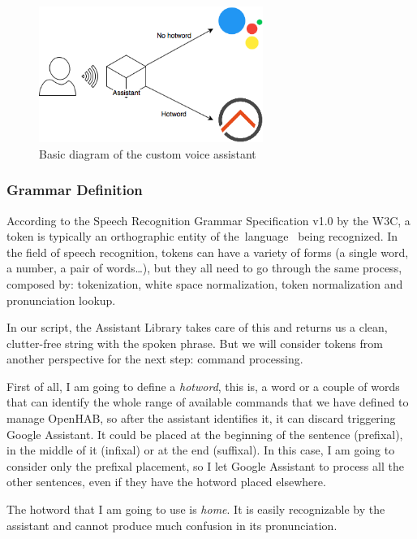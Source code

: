 \begin{figure}
	\centering
	\includegraphics[width=0.65\textwidth]{images/Chapter_06/custom-assistant-simple.png}
	\caption{Basic diagram of the custom voice assistant}
	\label{fig:custom-assistant-simple}
\end{figure}

\subsubsection{Grammar Definition}
According to the Speech Recognition Grammar Specification v1.0 by the W3C, a token is typically an orthographic entity of the language 
being recognized. In the field of speech recognition, tokens can have a variety of forms (a single word, a number, a pair of words…),
but they all need to go through the same process, composed by: tokenization, white space normalization, token normalization and
pronunciation lookup.\cite{w3SpeechGrammar}

In our script, the Assistant Library takes care of this and returns us a clean, clutter-free string with the spoken phrase. But we
will consider tokens from another perspective for the next step: command processing.

First of all, I am going to define a \textit{hotword}, this is, a word or a couple of words that can identify the whole range of
available commands that we have defined to manage OpenHAB, so after the assistant identifies it, it can discard triggering Google
Assistant. It could be placed at the beginning of the sentence (prefixal), in the middle of it (infixal) or at the end (suffixal).
In this case, I am going to consider only the prefixal placement, so I let Google Assistant to process all the other sentences,
even if they have the hotword placed elsewhere.

The hotword that I am going to use is \textit{home}. It is easily recognizable by the assistant and cannot produce much confusion
in its pronunciation.

